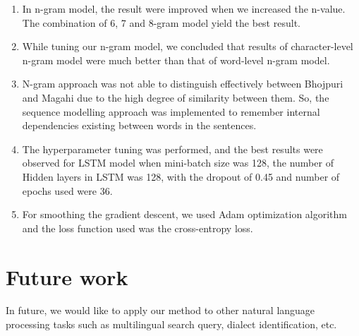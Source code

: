 \documentclass[11pt]{article}
\begin{document}
\begin{enumerate}
\item In n-gram model, the result were improved when we increased the n-value. The combination of 6, 7 and 8-gram model yield the best result.
\item While tuning our n-gram model, we concluded that results of character-level n-gram model were much better than that of word-level n-gram model.
\item N-gram approach was not able to distinguish effectively between Bhojpuri and Magahi due to the high degree of similarity between them. So, the sequence modelling approach was implemented to remember internal dependencies existing between words in the sentences.
\item The hyperparameter tuning was performed, and the best results were observed for LSTM model when mini-batch size was 128, the number of Hidden layers in LSTM was 128, with the dropout of 0.45 and number of epochs used were 36. 
\item For smoothing the gradient descent, we used Adam optimization algorithm and the loss function used was the cross-entropy loss.
\end{enumerate}

\section{Future work}
In future, we would like to apply our method to other natural language processing tasks such as multilingual search query, dialect identification, etc.



\end{document}
